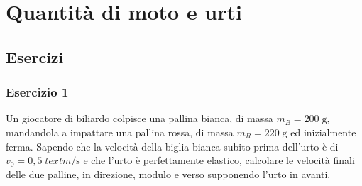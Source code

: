 \documentclass[12pt,a4paper]{book}
\begin{document}
\chapter{Quantità di moto e urti}
\section{Esercizi}

\subsection*{Esercizio 1}
Un giocatore di biliardo colpisce una pallina bianca, di massa $m_B=200 \; \text{g}$, mandandola a impattare una pallina rossa, di massa $m_R=220 \; \text{g}$ ed inizialmente ferma. Sapendo che la velocità della biglia bianca subito prima dell'urto è di $v_0=0,5 \; text{m}/\text{s}$ e che l'urto è perfettamente elastico, calcolare le velocità finali delle due palline, in direzione, modulo e verso supponendo l'urto in avanti.
\end{document}
